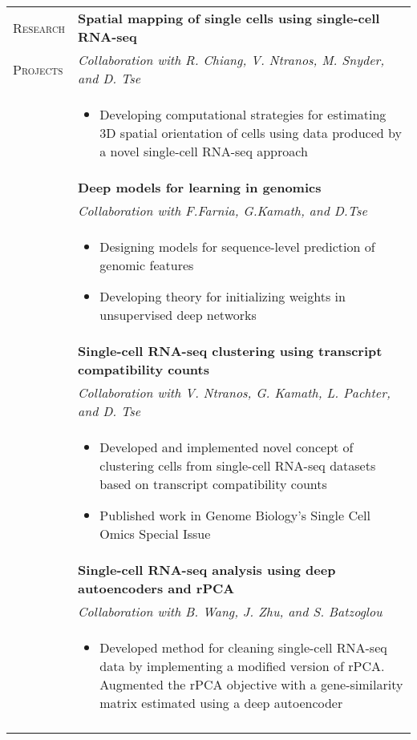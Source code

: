 \documentclass[letterpaper,11pt,oneside]{article}
\begin{document}
\begin{longtable}{@{} p{2.5cm} p{14.8cm}}
     
  \large{\textsc{Research}}  & \textbf{Spatial mapping of single cells using single-cell RNA-seq} \\
  \large{\textsc{Projects}} & \textit{Collaboration with R. Chiang, V. Ntranos, M. Snyder, and D. Tse} \\
& 
\vspace{-7mm}
\begin{itemize}[leftmargin=.5cm]
	\setlength\itemsep{-0.3em}
	\item Developing computational strategies for estimating 3D spatial orientation of cells using data produced by a novel single-cell RNA-seq approach
\end{itemize} 
\\  
& \textbf{Deep models for learning in genomics} \\
  & \textit{Collaboration with F.Farnia, G.Kamath, and D.Tse} \\
& 
\vspace{-7mm}
\begin{itemize}[leftmargin=.5cm]
	\setlength\itemsep{-0.3em}
	\item Designing models for sequence-level prediction of genomic features
	\item Developing theory for initializing weights in unsupervised deep networks
\end{itemize} 
\\
    & \textbf{Single-cell RNA-seq clustering using transcript compatibility counts} \\
    & \textit{Collaboration with V. Ntranos, G. Kamath, L. Pachter, and D. Tse} \\
& 
\vspace{-7mm}
\begin{itemize}[leftmargin=.5cm]
	\setlength\itemsep{-0.3em}
	\item Developed and implemented novel concept of clustering cells from single-cell RNA-seq datasets based on transcript compatibility counts
	\item Published work in Genome Biology’s Single Cell Omics Special Issue
\end{itemize} 
\\
    & \textbf{Single-cell RNA-seq analysis using deep autoencoders and rPCA} \\
    & \textit{Collaboration with B. Wang, J. Zhu, and S. Batzoglou} \\
& 
\vspace{-7mm}
\begin{itemize}[leftmargin=.5cm]
	\setlength\itemsep{-0.3em}
	\item Developed method for cleaning single-cell RNA-seq data by implementing a modified version of rPCA. Augmented the rPCA objective with a gene-similarity matrix estimated using a deep autoencoder
\end{itemize} 
\\
& \\


\end{longtable}
\end{document}
